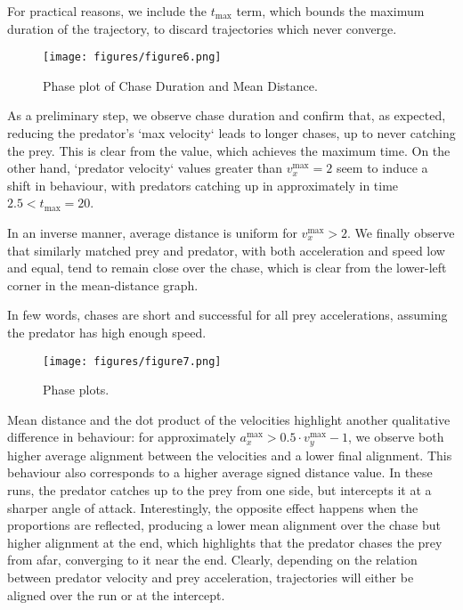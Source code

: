 \documentclass[11pt]{article}
\begin{document}
              For practical reasons, we include the $t_{\text{max}}$ term, which bounds the maximum duration of the trajectory, to discard trajectories which never converge.

              \begin{figure}[htbp]
                \centering
                \texttt{[image: figures/figure6.png]}
                \caption{Phase plot of Chase Duration and Mean Distance.}
                \label{fig:phaseplot1}
              \end{figure}

              As a preliminary step, we observe chase duration and confirm that, as expected, reducing the predator's `max velocity` leads to longer chases, up to never catching the prey. This is clear from the value, which achieves the maximum time. On the other hand, `predator velocity` values greater than $v_x^{\text{max}}=2$ seem to induce a shift in behaviour, with predators catching up in approximately in time $2.5 < t_{\text{max}} = 20$.

              In an inverse manner, average distance is uniform for $v_x^{\text{max}}>2$. We finally observe that similarly matched prey and predator, with both acceleration and speed low and equal, tend to remain close over the chase, which is clear from the lower-left corner in the mean-distance graph.

              In few words, chases are short and successful for all prey accelerations, assuming the predator has high enough speed.

              \begin{figure}[htbp]
                \centering
                \texttt{[image: figures/figure7.png]}
                \caption{Phase plots.}
                \label{fig:phaseplot2}
              \end{figure}

              Mean distance and the dot product of the velocities highlight another qualitative difference in behaviour: for approximately $a^{\text{max}}_x > 0.5\cdot v^{\text{max}}_y - 1$, we observe both higher average alignment between the velocities and a lower final alignment. This behaviour also corresponds to a higher average signed distance value. In these runs, the predator catches up to the prey from one side, but intercepts it at a sharper angle of attack. Interestingly, the opposite effect happens when the proportions are reflected, producing a lower mean alignment over the chase but higher alignment at the end, which highlights that the predator chases the prey from afar, converging to it near the end. Clearly, depending on the relation between predator velocity and prey acceleration, trajectories will either be aligned over the run or at the intercept.
\end{document}
